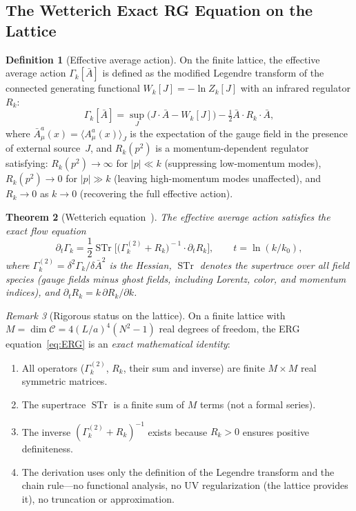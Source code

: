\documentclass[12pt,a4paper]{article}
\theoremstyle{plain}
\newtheorem{theorem}{Theorem}[section]
\theoremstyle{definition}
\newtheorem{definition}[theorem]{Definition}
\theoremstyle{remark}
\newtheorem{remark}[theorem]{Remark}
\begin{document}
\subsection{The Wetterich Exact RG Equation on the Lattice}\label{sec:ERG}

\begin{definition}[Effective average action]\label{def:Gamma}
On the finite lattice, the effective average action $\Gamma_k[\bar{A}]$ is defined as the modified Legendre transform of the connected generating functional $W_k[J]=-\ln Z_k[J]$ with an infrared regulator $R_k$:
\begin{equation}\label{eq:Gammadef}
\Gamma_k[\bar{A}] = \sup_J\big(J\cdot\bar{A} - W_k[J]\big) - \tfrac{1}{2}\bar{A}\cdot R_k\cdot\bar{A},
\end{equation}
where $\bar{A}_\mu^a(x)=\langle A_\mu^a(x)\rangle_J$ is the expectation of the gauge field in the presence of external source~$J$, and $R_k(p^2)$ is a momentum-dependent regulator satisfying: $R_k(p^2)\to\infty$ for $|p|\ll k$ (suppressing low-momentum modes), $R_k(p^2)\to 0$ for $|p|\gg k$ (leaving high-momentum modes unaffected), and $R_k\to 0$ as $k\to 0$ (recovering the full effective action).
\end{definition}

\begin{theorem}[Wetterich equation~\cite{Wetterich1993}]\label{thm:ERG}
The effective average action satisfies the exact flow equation
\begin{equation}\label{eq:ERG}
\partial_t\Gamma_k = \frac{1}{2}\operatorname{STr}\!\bigg[\Big(\Gamma_k^{(2)} + R_k\Big)^{\!-1}\cdot\partial_t R_k\bigg], \qquad t = \ln(k/k_0),
\end{equation}
where $\Gamma_k^{(2)}=\delta^2\Gamma_k/\delta\bar{A}^2$ is the Hessian, $\operatorname{STr}$ denotes the supertrace over all field species (gauge fields minus ghost fields, including Lorentz, color, and momentum indices), and $\partial_t R_k = k\,\partial R_k/\partial k$.
\end{theorem}

\begin{remark}[Rigorous status on the lattice]\label{rem:rigorous}
On a finite lattice with $M=\dim\mathcal{C}=4(L/a)^4(N^2-1)$ real degrees of freedom, the ERG equation~\eqref{eq:ERG} is an \emph{exact mathematical identity}:
\begin{enumerate}[label=(\roman*),nosep]
\item All operators ($\Gamma_k^{(2)}$, $R_k$, their sum and inverse) are finite $M\times M$ real symmetric matrices.
\item The supertrace $\operatorname{STr}$ is a finite sum of $M$ terms (not a formal series).
\item The inverse $(\Gamma_k^{(2)}+R_k)^{-1}$ exists because $R_k>0$ ensures positive definiteness.
\item The derivation uses only the definition of the Legendre transform and the chain rule---no functional analysis, no UV regularization (the lattice provides it), no truncation or approximation.
\end{enumerate}
\end{remark}
\end{document}
